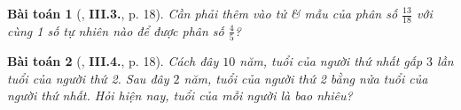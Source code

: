 \documentclass{article}
\numberwithin{equation}{section}
\newtheorem{baitoan}{Bài toán}
\begin{document}
\begin{baitoan}[\cite{SBT_Toan_8_tap_2}, \textbf{III.3.}, p. 18]
	Cần phải thêm vào tử \& mẫu của phân số $\frac{13}{18}$ với cùng 1 số tự nhiên nào để được phân số $\frac{4}{5}$?
\end{baitoan}

\begin{baitoan}[\cite{SBT_Toan_8_tap_2}, \textbf{III.4.}, p. 18]
	Cách đây $10$ năm, tuổi của người thứ nhất gấp $3$ lần tuổi của người thứ 2. Sau đây $2$ năm, tuổi của người thứ 2 bằng nửa tuổi của người thứ nhất. Hỏi hiện nay, tuổi của mỗi người là bao nhiêu?
\end{baitoan}


\printbibliography[heading=bibintoc]
	
\end{document}
